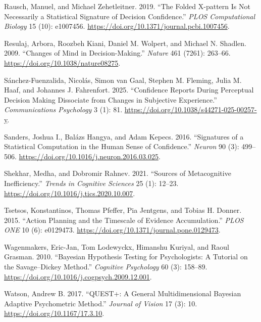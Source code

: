 \documentclass[
]{article}
\newlength{\cslhangindent}
\newenvironment{CSLReferences}[2] %
 {\begin{list}{}{%
  \setlength{\itemindent}{0pt}
  \setlength{\leftmargin}{0pt}
  \setlength{\parsep}{0pt}
  \ifodd #1
   \setlength{\leftmargin}{\cslhangindent}
   \setlength{\itemindent}{-1\cslhangindent}
  \fi
  \setlength{\itemsep}{#2\baselineskip}}}
 {\end{list}}
\begin{document}
\begin{CSLReferences}{1}{1}
Rausch, Manuel, and Michael Zehetleitner. 2019. {``The Folded
{X-pattern} Is Not Necessarily a Statistical Signature of Decision
Confidence.''} \emph{PLOS Computational Biology} 15 (10): e1007456.
\url{https://doi.org/10.1371/journal.pcbi.1007456}.

Resulaj, Arbora, Roozbeh Kiani, Daniel M. Wolpert, and Michael N.
Shadlen. 2009. {``Changes of Mind in Decision-Making.''} \emph{Nature}
461 (7261): 263--66. \url{https://doi.org/10.1038/nature08275}.

Sánchez-Fuenzalida, Nicolás, Simon van Gaal, Stephen M. Fleming, Julia
M. Haaf, and Johannes J. Fahrenfort. 2025. {``Confidence Reports During
Perceptual Decision Making Dissociate from Changes in Subjective
Experience.''} \emph{Communications Psychology} 3 (1): 81.
\url{https://doi.org/10.1038/s44271-025-00257-y}.

Sanders, Joshua I., Balázs Hangya, and Adam Kepecs. 2016. {``Signatures
of a Statistical Computation in the Human Sense of Confidence.''}
\emph{Neuron} 90 (3): 499--506.
\url{https://doi.org/10.1016/j.neuron.2016.03.025}.

Shekhar, Medha, and Dobromir Rahnev. 2021. {``Sources of {Metacognitive
Inefficiency}.''} \emph{Trends in Cognitive Sciences} 25 (1): 12--23.
\url{https://doi.org/10.1016/j.tics.2020.10.007}.

Tsetsos, Konstantinos, Thomas Pfeffer, Pia Jentgens, and Tobias H.
Donner. 2015. {``Action {Planning} and the {Timescale} of {Evidence
Accumulation}.''} \emph{PLOS ONE} 10 (6): e0129473.
\url{https://doi.org/10.1371/journal.pone.0129473}.

Wagenmakers, Eric-Jan, Tom Lodewyckx, Himanshu Kuriyal, and Raoul
Grasman. 2010. {``Bayesian Hypothesis Testing for Psychologists: {A}
Tutorial on the {Savage}--{Dickey} Method.''} \emph{Cognitive
Psychology} 60 (3): 158--89.
\url{https://doi.org/10.1016/j.cogpsych.2009.12.001}.

Watson, Andrew B. 2017. {``{QUEST}+: {A} General Multidimensional
{Bayesian} Adaptive Psychometric Method.''} \emph{Journal of Vision} 17
(3): 10. \url{https://doi.org/10.1167/17.3.10}.


\end{CSLReferences}
\end{document}
